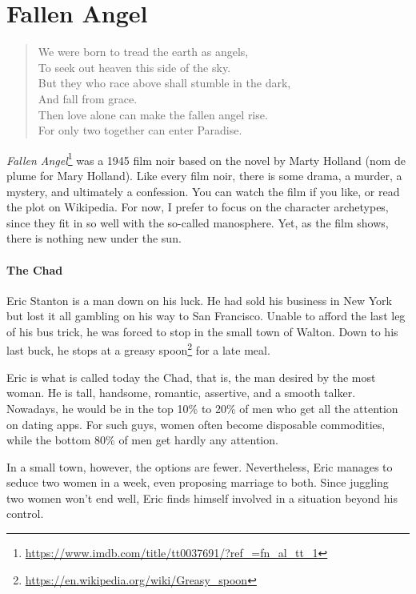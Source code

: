 \section{Fallen Angel}

\begin{quotex}
\begin{verse}
We were born to tread the earth as angels,\\ 
To seek out heaven this side of the sky.\\ 
But they who race above shall stumble in the dark,\\ 
And fall from grace.\\ 
Then love alone can make the fallen angel rise.\\ 
For only two together can enter Paradise.
\end{verse}
\end{quotex}

\textit{Fallen Angel}\footnote{\url{https://www.imdb.com/title/tt0037691/?ref_=fn_al_tt_1}} was a 1945 film noir based on the novel by Marty Holland (nom de plume for Mary Holland). Like every film noir, there is some drama, a murder, a mystery, and ultimately a confession. You can watch the film if you like, or read the plot on Wikipedia. For now, I prefer to focus on the character archetypes, since they fit in so well with the so-called manosphere. Yet, as the film shows, there is nothing new under the sun.

\paragraph{The Chad}


Eric Stanton is a man down on his luck. He had sold his business in New York but lost it all gambling on his way to San Francisco. Unable to afford the last leg of his bus trick, he was forced to stop in the small town of Walton. Down to his last buck, he stops at a greasy spoon\footnote{\url{https://en.wikipedia.org/wiki/Greasy_spoon}} for a late meal.

Eric is what is called today the Chad, that is, the man desired by the most woman. He is tall, handsome, romantic, assertive, and a smooth talker. Nowadays, he would be in the top 10\% to 20\% of men who get all the attention on dating apps. For such guys, women often become disposable commodities, while the bottom 80\% of men get hardly any attention.

In a small town, however, the options are fewer. Nevertheless, Eric manages to seduce two women in a week, even proposing marriage to both. Since juggling two women won't end well, Eric finds himself involved in a situation beyond his control.

